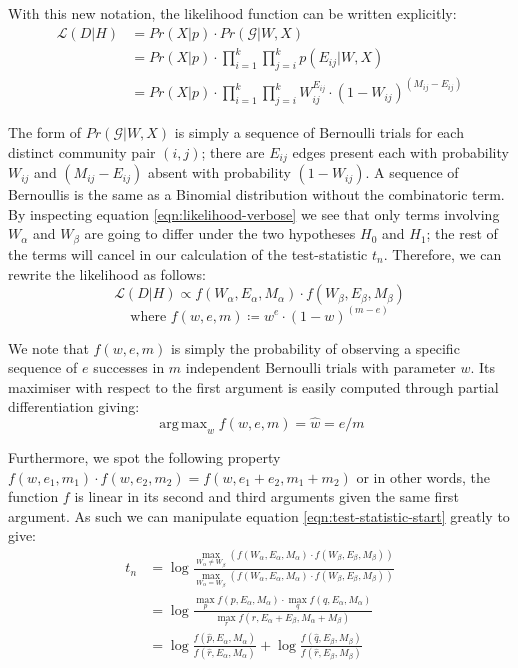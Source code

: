 \documentclass[11pt]{article}
\DeclareMathOperator*{\argmax}{arg\,max}
\newcommand{\Gcal}{\mathcal{G}}
\newcommand{\lik}{\mathcal{L}}
\begin{document}
\begin{multicols*}{2}
With this new notation, the likelihood function can be written explicitly:
%
\begin{align}
\lik(D | H) &= Pr(X| p) \cdot Pr(\Gcal | W, X) \nonumber \\
&= Pr(X | p) \cdot \prod_{i=1}^{k} \prod_{j=i}^{k} p(E_{ij} | W, X) \nonumber \\
&= Pr(X | p) \cdot \prod_{i=1}^{k} \prod_{j=i}^{k} W_{ij} ^ {E_{ij}} \cdot \left( 1 - W_{ij} \right) ^ {(M_{ij} - E_{ij})}
\label{eqn:likelihood-verbose}
\end{align}

The form of $Pr(\Gcal | W, X)$ is simply a sequence of Bernoulli trials for each distinct community pair $(i, j)$; there are $E_{ij}$ edges present each with probability $W_{ij}$ and $(M_{ij} - E_{ij})$ absent with probability $(1 - W_{ij})$. A sequence of Bernoullis is the same as a Binomial distribution without the combinatoric term. By inspecting equation \ref{eqn:likelihood-verbose} we see that only terms involving $W_{\alpha}$ and $W_{\beta}$ are going to differ under the two hypotheses $H_0$ and $H_1$; the rest of the terms will cancel in our calculation of the test-statistic $t_n$. Therefore, we can rewrite the likelihood as follows:
%
\begin{equation}
	\lik (D | H) \propto f (W_\alpha, E_\alpha, M_\alpha) \cdot f (W_\beta, E_\beta, M_\beta)
\end{equation} 
\begin{equation}
	\textrm{where } f (w, e, m) \coloneqq w^e \cdot (1-w)^{(m - e)}
	\label{eqn:f-defn}
\end{equation}

We note that $f(w, e, m)$ is simply the probability of observing a specific sequence of $e$ successes in $m$ independent Bernoulli trials with parameter $w$. Its maximiser with respect to the first argument is easily computed through partial differentiation giving:
%
\begin{equation}
	\argmax_w f(w, e, m) = \hat{w} = e / m
	\label{eqn:f-maximiser}
\end{equation}

Furthermore, we spot the following property $f(w, e_1, m_1) \cdot f(w, e_2, m_2) = f(w, e_1 + e_2, m_1 + m_2)$ or in other words, the function $f$ is linear in its second and third arguments given the same first argument. As such we can manipulate equation \ref{eqn:test-statistic-start} greatly to give:
%
\begin{align}
	t_n &= \log \frac
	{
		\max_{W_{\alpha} \neq W_{\beta}}(f (W_\alpha, E_\alpha, M_\alpha) \cdot f (W_\beta, E_\beta, M_\beta))
	}
	{
		\max_{W_\alpha = W_\beta} (f (W_\alpha, E_\alpha, M_\alpha) \cdot f (W_\beta, E_\beta, M_\beta))
	} \nonumber \\
	&= \log \frac{
		\max_p f(p, E_\alpha, M_\alpha) \cdot \max_q f(q, E_\alpha, M_\alpha)
	}{
		\max_r f(r, E_\alpha + E_\beta, M_\alpha + M_\beta)
	} \nonumber \\
	&= \log \frac{f(\hat{p}, E_\alpha, M_\alpha)}{f(\hat{r}, E_\alpha, M_\alpha)} + \log \frac{f(\hat{q}, E_\beta, M_\beta)}{f(\hat{r}, E_\beta, M_\beta)}
\end{align}


\end{multicols*}
\end{document}

